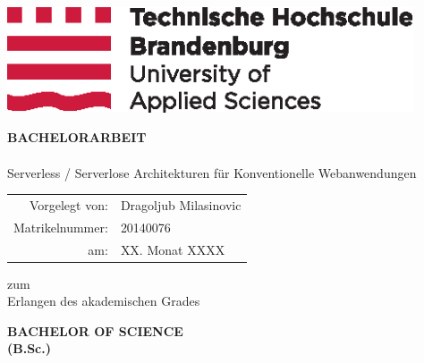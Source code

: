 \documentclass[
12pt,
english,
ngerman,
headsepline,
twoside,
openright,
numbers=noenddot,version=first
]{scrreprt}
\providecommand{\tabularnewline}{\\}
\begin{document}
\titlepage

\begin{center}
\includegraphics[width=12cm]{pics/2015_10_05_THB_Logo_CMYK_randlos}\vspace{0.5cm}

\par\end{center}

\vspace{1cm}

\noindent \begin{center}
\textsf{\textbf{\large BACHELORARBEIT}}\textsf{}\\

\textsf{}\\
\textsf{\huge Serverless / Serverlose Architekturen für Konventionelle Webanwendungen}
\par\end{center}{\Large \par}

\vspace{2cm}

\noindent \begin{center}
{\huge }\begin{tabular}{rl}
Vorgelegt von: & Dragoljub Milasinovic\tabularnewline
Matrikelnummer: & 20140076\tabularnewline
am: & XX. Monat XXXX\tabularnewline
\end{tabular}
\par\end{center}{\huge \par}

\vspace{1cm}

\noindent \begin{center}
zum \\
Erlangen des akademischen Grades\textsf{}\\
\par\end{center}
\noindent \begin{center}
\textsf{\textbf{\large BACHELOR OF SCIENCE}}\textsf{\textbf{\LARGE }}\\
\textsf{\textbf{(B.Sc.)}}
\par\end{center}
\end{document}
